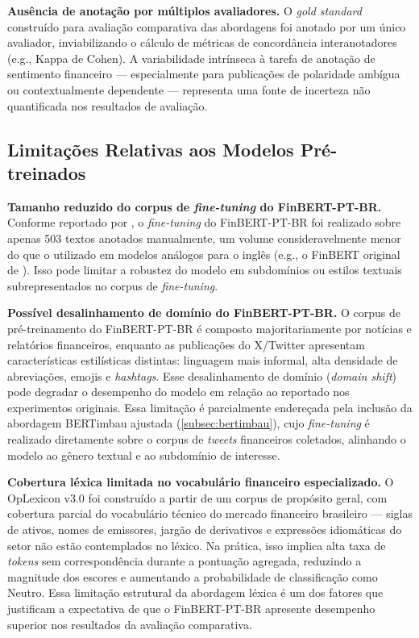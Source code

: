 \textbf{Ausência de anotação por múltiplos avaliadores.} O \textit{gold standard} construído para avaliação comparativa das abordagens foi anotado por um único avaliador, inviabilizando o cálculo de métricas de concordância interanotadores (e.g., Kappa de Cohen). A variabilidade intrínseca à tarefa de anotação de sentimento financeiro --- especialmente para publicações de polaridade ambígua ou contextualmente dependente --- representa uma fonte de incerteza não quantificada nos resultados de avaliação.


\subsection{Limitações Relativas aos Modelos Pré-treinados}
\label{subsec:lim_modelo}

\textbf{Tamanho reduzido do corpus de \textit{fine-tuning} do FinBERT-PT-BR.} Conforme reportado por , o \textit{fine-tuning} do FinBERT-PT-BR foi realizado sobre apenas 503 textos anotados manualmente, um volume consideravelmente menor do que o utilizado em modelos análogos para o inglês (e.g., o FinBERT original de ). Isso pode limitar a robustez do modelo em subdomínios ou estilos textuais subrepresentados no corpus de \textit{fine-tuning}.

\textbf{Possível desalinhamento de domínio do FinBERT-PT-BR.} O corpus de pré-treinamento do FinBERT-PT-BR é composto majoritariamente por notícias e relatórios financeiros, enquanto as publicações do X/Twitter apresentam características estilísticas distintas: linguagem mais informal, alta densidade de abreviações, emojis e \textit{hashtags}. Esse desalinhamento de domínio (\textit{domain shift}) pode degradar o desempenho do modelo em relação ao reportado nos experimentos originais. Essa limitação é parcialmente endereçada pela inclusão da abordagem BERTimbau ajustada (\autoref{subsec:bertimbau}), cujo \textit{fine-tuning} é realizado diretamente sobre o corpus de \textit{tweets} financeiros coletados, alinhando o modelo ao gênero textual e ao subdomínio de interesse.

\textbf{Cobertura léxica limitada no vocabulário financeiro especializado.} O OpLexicon v3.0 foi construído a partir de um corpus de propósito geral, com cobertura parcial do vocabulário técnico do mercado financeiro brasileiro — siglas de ativos, nomes de emissores, jargão de derivativos e expressões idiomáticas do setor não estão contemplados no léxico. Na prática, isso implica alta taxa de \textit{tokens} sem correspondência durante a pontuação agregada, reduzindo a magnitude dos escores e aumentando a probabilidade de classificação como Neutro. Essa limitação estrutural da abordagem léxica é um dos fatores que justificam a expectativa de que o FinBERT-PT-BR apresente desempenho superior nos resultados da avaliação comparativa.

